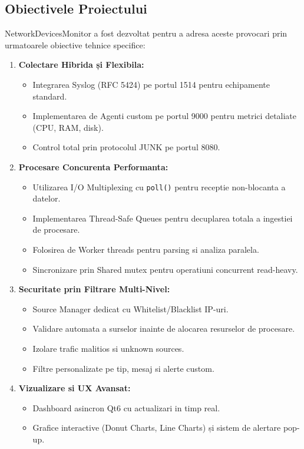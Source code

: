 \documentclass[runningheads]{llncs}
\begin{document}
\subsection{Obiectivele Proiectului}
NetworkDevicesMonitor a fost dezvoltat pentru a adresa aceste provocari prin urmatoarele obiective tehnice specifice:

\begin{enumerate}
    \item \textbf{Colectare Hibrida și Flexibila:} 
    \begin{itemize}
        \item Integrarea Syslog (RFC 5424) pe portul 1514 pentru echipamente standard.
        \item Implementarea de Agenti custom pe portul 9000 pentru metrici detaliate (CPU, RAM, disk).
        \item Control total prin protocolul JUNK pe portul 8080.
    \end{itemize}
    
    \item \textbf{Procesare Concurenta Performanta:}
    \begin{itemize}
        \item Utilizarea I/O Multiplexing cu \texttt{poll()} pentru receptie non-blocanta a datelor.
        \item Implementarea Thread-Safe Queues pentru decuplarea totala a ingestiei de procesare.
        \item Folosirea de Worker threads pentru parsing si analiza paralela.
        \item Sincronizare prin Shared mutex pentru operatiuni concurrent read-heavy.
    \end{itemize}
    
    \item \textbf{Securitate prin Filtrare Multi-Nivel:}
    \begin{itemize}
        \item Source Manager dedicat cu Whitelist/Blacklist IP-uri.
        \item Validare automata a surselor inainte de alocarea resurselor de procesare.
        \item Izolare trafic malitios si unknown sources.
        \item Filtre personalizate pe tip, mesaj si alerte custom.
    \end{itemize}
    
    \item \textbf{Vizualizare si UX Avansat:}
    \begin{itemize}
        \item Dashboard asincron Qt6 cu actualizari in timp real.
        \item Grafice interactive (Donut Charts, Line Charts) și sistem de alertare pop-up.
    \end{itemize}
\end{enumerate}
\end{document}

